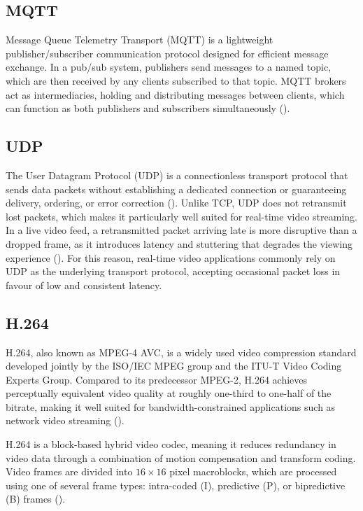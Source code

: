     
    
    \subsection{MQTT}
    
Message Queue Telemetry Transport (MQTT) is a lightweight publisher/subscriber communication protocol designed for efficient message exchange. In a pub/sub system, publishers send messages to a named topic, which are then received by any clients subscribed to that topic. MQTT brokers act as intermediaries, holding and distributing messages between clients, which can function as both publishers and subscribers simultaneously (\cite{soni2017mqtt}).


    \subsection{UDP}
    
The User Datagram Protocol (UDP) is a connectionless transport protocol that sends
data packets without establishing a dedicated connection or guaranteeing delivery,
ordering, or error correction (\cite{rfc3550}). Unlike TCP, UDP does not retransmit
lost packets, which makes it particularly well suited for real-time video streaming.
In a live video feed, a retransmitted packet arriving late is more disruptive than
a dropped frame, as it introduces latency and stuttering that degrades the viewing
experience (\cite{rfc3550}). For this reason, real-time video applications commonly
rely on UDP as the underlying transport protocol, accepting occasional packet loss
in favour of low and consistent latency.

\subsection{H.264}

H.264, also known as MPEG-4 AVC, is a widely used video compression standard
developed jointly by the ISO/IEC MPEG group and the ITU-T Video Coding Experts
Group. Compared to its predecessor MPEG-2, H.264 achieves perceptually equivalent
video quality at roughly one-third to one-half of the bitrate, making it well suited
for bandwidth-constrained applications such as network video streaming (\cite{1709847}).

H.264 is a block-based hybrid video codec, meaning it reduces redundancy in video
data through a combination of motion compensation and transform coding. Video frames
are divided into $16 \times 16$ pixel macroblocks, which are processed using one of
several frame types: intra-coded (I), predictive (P), or bipredictive (B) frames
(\cite{1709847}).

